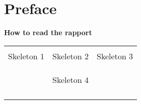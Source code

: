 \chapter*{Preface}

\lipsum[2-2]

\textbf{How to read the rapport}

\lipsum[3-3]

\phantom{Luft}

\phantom{Luft}

\begin{table}[H]
	\centering
		\begin{tabular}{c c c}
			\underline{\phantom{mmmmmmmmmmmmmm}} & \underline{\phantom{mmmmmmmmmmmmmm}} & \underline{\phantom{mmmmmmmmmmmmmm}} \\
			Skeleton 1							& 				Skeleton 2 			  & 					Skeleton 3 			\\
			&&\\
			&&\\
			{\phantom{mmmmmmmmmmmmmm}} & \underline{\phantom{mmmmmmmmmmmmmm}} & {\phantom{mmmmmmmmmmmmmm}} \\
								& Skeleton 4 		&  				\\
			&&\\
			&&\\
		 							& {\phantom{mmmmmmmmmmmmmm}} 	&			\\														
									& 							& 												
		\end{tabular}
\end{table}